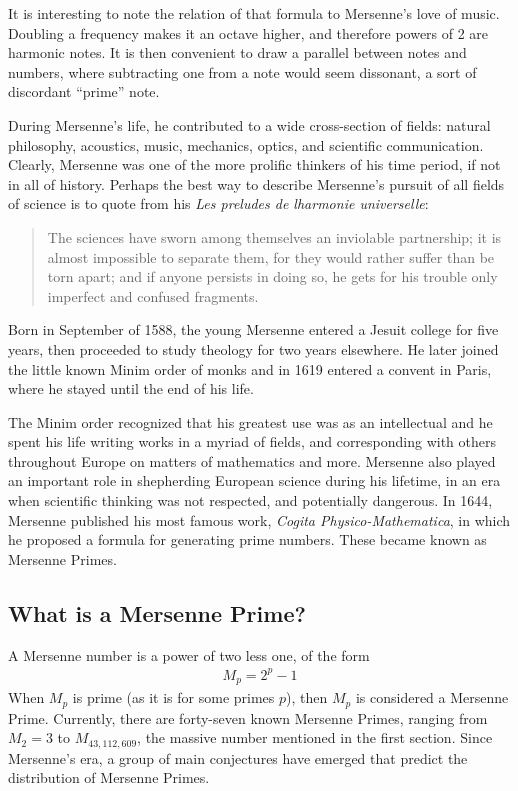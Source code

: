 It is interesting to note the relation of that formula to Mersenne's love of music.  Doubling a frequency makes it an octave higher, and therefore powers of 2 are harmonic notes.  It is then convenient to draw a parallel between notes and numbers, where subtracting one from  a note would seem dissonant, a sort of discordant ``prime'' note. 

During Mersenne's life, he contributed to a wide cross-section of fields: natural philosophy, acoustics, music, mechanics, optics, and scientific communication\cite{scibio}. Clearly, Mersenne was one of the more prolific thinkers of his time period, if not in all of history. Perhaps the best way to describe Mersenne's pursuit of all fields of science is to quote from his \emph{Les preludes de lharmonie universelle}:

\begin{quote}
The sciences have sworn among themselves an inviolable partnership; it is almost impossible to separate them, for they would rather suffer than be torn apart; and if anyone persists in doing so, he gets for his trouble only imperfect and confused fragments. \cite{lfrench}
\end{quote}

Born in September of 1588, the young Mersenne entered a Jesuit college for five years, then proceeded to study theology for two years elsewhere. He later joined the little known Minim order of monks and in 1619 entered a convent in Paris, where he stayed until the end of his life.

The Minim order recognized that his greatest use was as an intellectual and he spent his life writing works in a myriad of fields, and corresponding with others throughout Europe on matters of mathematics and more. Mersenne also played an important role in shepherding European science during his lifetime, in an era when scientific thinking was not respected, and potentially dangerous. In 1644, Mersenne published his most famous work, \emph{Cogita Physico-Mathematica}, in which he proposed a formula for generating prime numbers. These became known as Mersenne Primes.

\subsection{What is a Mersenne Prime?}

A Mersenne number is a power of two less one, of the form
\begin{align}
M_p = 2^p - 1
\label{eqn:mp}
\end{align}
When $M_p$ is prime (as it is for some primes $p$), then $M_p$ is considered a Mersenne Prime. Currently,
there are forty-seven known Mersenne Primes, ranging from $M_2 = 3$ to $M_{43,112,609}$, the massive number mentioned in the first section. Since Mersenne's era, a group of main conjectures have emerged that predict the distribution of Mersenne Primes.


